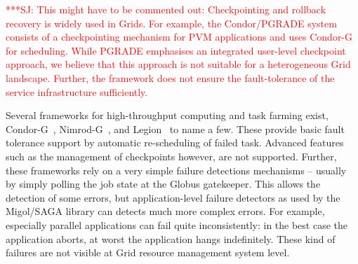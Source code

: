\documentclass[times, 10pt, twocolumn]{article}
\newcommand{\jhanote}[1]{ {\textcolor{red} { ***SJ: #1 }}}
\newcommand{\jhanote}[1]{}
\newcommand{\up}{\vspace*{-1em}}
\begin{document}



\up
\jhanote{This might have to be commented out: Checkpointing and
  rollback recovery is widely used in Grids. For example, the
  Condor/PGRADE system~\cite{DBLP:conf/eagc/KovacsK04} consists of a
  checkpointing mechanism for PVM applications and uses
  Condor-G~\cite{citeulike:291860} for scheduling.  While PGRADE
  emphasises an integrated user-level checkpoint approach, we believe
  that this approach is not suitable for a heterogeneous Grid
  landscape. Further, the framework does not ensure the
  fault-tolerance of the service infrastructure sufficiently.}
                                 





Several frameworks for high-throughput computing and task farming
exist, Condor-G~\cite{citeulike:291860},
Nimrod-G~\cite{buyya00nimrodg}, and Legion~\cite{689541} to name a
few. These provide basic fault tolerance support by automatic
re-scheduling of failed task. Advanced features such as the management
of checkpoints however, are not supported. Further, these frameworks
rely on a very simple failure detections mechanisms -- usually by
simply polling the job state at the Globus gatekeeper. This allows the
detection of some errors, but application-level failure detectors as
used by the Migol/SAGA library can detects much more complex
errors. For example, especially parallel applications can fail quite
inconsistently: in the best case the application aborts, at worst the
application hangs indefinitely. These kind of failures are not visible
at Grid resource management system level.
\end{document}
